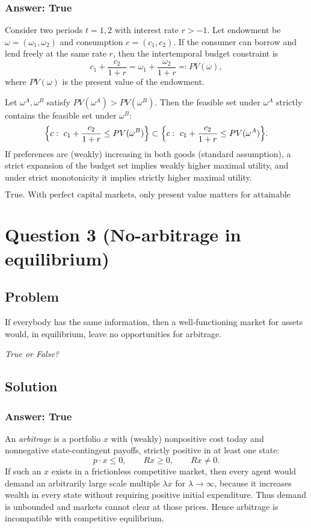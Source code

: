 \documentclass[12pt]{article}
\begin{document}
\subsubsection*{Answer: True}
Consider two periods \(t=1,2\) with interest rate \(r>-1\). Let endowment be \(\omega=(\omega_1,\omega_2)\) and consumption \(c=(c_1,c_2)\).
If the consumer can borrow and lend freely at the same rate \(r\), then the intertemporal budget constraint is
\[
c_1+\frac{c_2}{1+r}=\omega_1+\frac{\omega_2}{1+r}\eqqcolon PV(\omega),
\]
where \(PV(\omega)\) is the present value of the endowment.

Let \(\omega^A,\omega^B\) satisfy \(PV(\omega^A)>PV(\omega^B)\). Then the feasible set under \(\omega^A\) strictly contains the feasible set under \(\omega^B\):
\[
\Bigl\{c:\ c_1+\frac{c_2}{1+r}\le PV(\omega^B)\Bigr\}
\subset
\Bigl\{c:\ c_1+\frac{c_2}{1+r}\le PV(\omega^A)\Bigr\}.
\]
If preferences are (weakly) increasing in both goods (standard assumption), a strict expansion of the budget set implies weakly higher maximal utility, and under strict monotonicity it implies strictly higher maximal utility.

\[
\boxed{\text{True. With perfect capital markets, only present value matters for attainable consumption.}}
\]

\newpage
\section*{Question 3 (No-arbitrage in equilibrium)}
\subsection*{Problem}
If everybody has the same information, then a well-functioning market for assets would, in equilibrium, leave no opportunities for arbitrage.

\emph{True or False?}

\subsection*{Solution}
\subsubsection*{Answer: True}
An \emph{arbitrage} is a portfolio \(x\) with (weakly) nonpositive cost today and nonnegative state-contingent payoffs, strictly positive in at least one state:
\[
p\cdot x \le 0,\qquad Rx\ge 0,\qquad Rx\neq 0.
\]
If such an \(x\) exists in a frictionless competitive market, then every agent would demand an arbitrarily large scale multiple \(\lambda x\) for \(\lambda\to\infty\), because it increases wealth in every state without requiring positive initial expenditure.
Thus demand is unbounded and markets cannot clear at those prices. Hence arbitrage is incompatible with competitive equilibrium.
\end{document}
